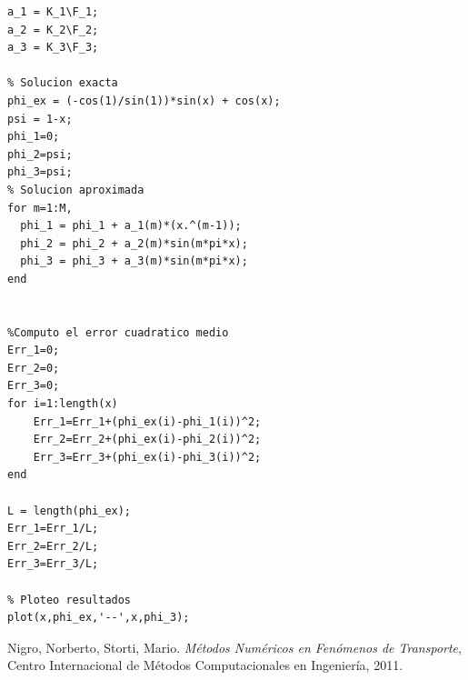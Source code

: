 \documentclass[11pt]{article}
\begin{document}
\begin{lstlisting}[frame=single]
% Computo la solucion
a_1 = K_1\F_1;
a_2 = K_2\F_2;
a_3 = K_3\F_3;

% Solucion exacta
phi_ex = (-cos(1)/sin(1))*sin(x) + cos(x); 
psi = 1-x;
phi_1=0;
phi_2=psi;
phi_3=psi;
% Solucion aproximada
for m=1:M,
  phi_1 = phi_1 + a_1(m)*(x.^(m-1));
  phi_2 = phi_2 + a_2(m)*sin(m*pi*x);
  phi_3 = phi_3 + a_3(m)*sin(m*pi*x);
end  


%Computo el error cuadratico medio
Err_1=0;
Err_2=0;
Err_3=0;
for i=1:length(x)
    Err_1=Err_1+(phi_ex(i)-phi_1(i))^2;
    Err_2=Err_2+(phi_ex(i)-phi_2(i))^2;
    Err_3=Err_3+(phi_ex(i)-phi_3(i))^2;
end

L = length(phi_ex);
Err_1=Err_1/L;
Err_2=Err_2/L;
Err_3=Err_3/L;

% Ploteo resultados
plot(x,phi_ex,'--',x,phi_3);
\end{lstlisting}
\bigskip

\newpage

\begin{thebibliography}{9}                                                                                                %
Nigro, Norberto, Storti, Mario. \textit{M\'etodos Num\'ericos en Fen\'omenos de Transporte}, Centro Internacional de M\'etodos Computacionales en Ingenier\'ia, 2011.
\end{thebibliography}
\end{document}

